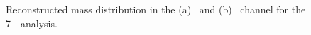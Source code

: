 \begin{figure}[!htb]\begin{center}
	\caption{Reconstructed mass distribution in the (a) \loose\ and (b) \tight\ 
        channel for the 7~\tev\ analysis.\label{fig:7tevmreco}}
\end{center}\end{figure}


